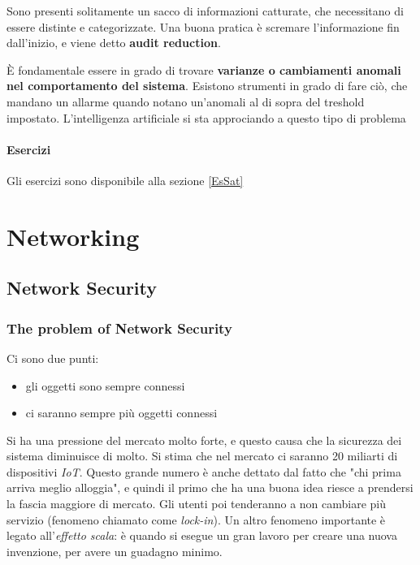 Sono presenti solitamente un sacco di informazioni catturate, che necessitano 
di essere distinte e categorizzate.
Una buona pratica è scremare l'informazione fin dall'inizio, e viene detto 
\textbf{audit reduction}.

È fondamentale essere in grado di trovare \textbf{varianze o cambiamenti 
anomali nel comportamento del sistema}. Esistono strumenti in grado di fare 
ciò, che mandano un allarme quando notano un'anomali al di sopra del treshold 
impostato. L'intelligenza artificiale si sta approciando a questo tipo di 
problema

\subsection{Esercizi}

Gli esercizi sono disponibile alla sezione \ref{EsSat}


\part{Networking}

\chapter{Network Security}

\section{The problem of Network Security}

Ci sono due punti:

\begin{itemize}
\item gli oggetti sono sempre connessi
\item ci saranno sempre più oggetti connessi
\end{itemize}

Si ha una pressione del mercato molto forte, e questo causa che la sicurezza 
dei sistema diminuisce di molto. Si stima che nel mercato ci saranno 20 
miliarti di dispositivi \textit{IoT}. Questo grande numero è anche dettato dal 
fatto che "chi prima arriva meglio alloggia", e quindi il primo che ha una 
buona idea riesce a prendersi la fascia maggiore di mercato. Gli utenti poi 
tenderanno a non cambiare più servizio (fenomeno chiamato come 
\textit{lock-in}). Un altro fenomeno importante è legato all'\textit{effetto 
scala}: è quando si esegue un gran lavoro per creare una nuova invenzione, per 
avere un guadagno minimo.

